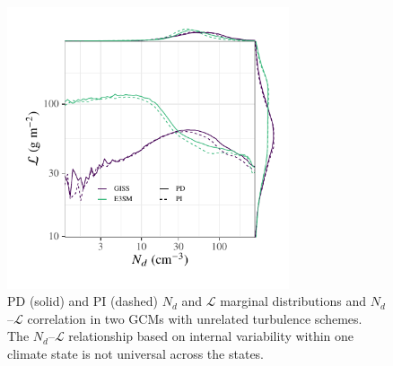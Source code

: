 \documentclass[acp, manuscript]{copernicus}\usepackage[]{graphicx}\usepackage[]{xcolor}
\newenvironment{knitrout}{}{} %
\newcommand\nd{\ensuremath{N_d}}
\newcommand\lwp{\ensuremath{\mathcal L}}
\begin{document}
\begin{figure}[t]
  \centering

\begin{knitrout}
\color{fgcolor}

{\centering \includegraphics[width=8.3cm]{figure/multimodel-selected-pd-pi-plot-print-1} 

}


\end{knitrout}
  \caption{PD (solid) and PI (dashed) \nd{} and \lwp{} marginal distributions
    and \nd--\lwp{} correlation in two GCMs with
    unrelated turbulence schemes.  The \nd--\lwp{} relationship based on
    internal variability within one climate state is not universal across the
    states.}
  \label{fig:cms-selected}
\end{figure}
%
\clearpage
%
%
%
\end{document}
